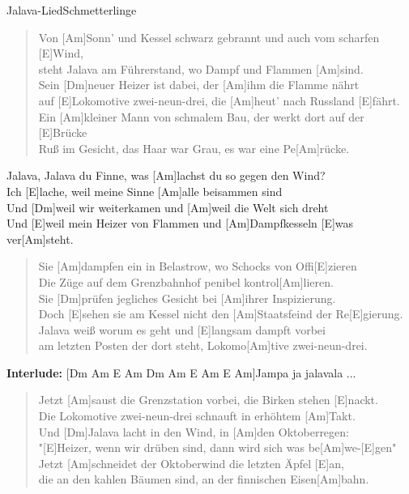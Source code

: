 \begin{song}{Jalava-Lied}{Schmetterlinge}

    \begin{verse}  
        Von [Am]Sonn' und Kessel schwarz gebrannt und auch vom scharfen [E]Wind, \\
        steht Jalava am Führerstand, wo Dampf und Flammen [Am]sind. \\
        Sein [Dm]neuer Heizer ist dabei, der [Am]ihm die Flamme nährt \\
        auf [E]Lokomotive zwei-neun-drei, die [Am]heut' nach Russland [E]fährt. \\
        Ein [Am]kleiner Mann von schmalem Bau, der werkt dort auf der [E]Brücke \\
        Ruß im Gesicht, das Haar war Grau, es war eine Pe[Am]rücke.
    \end{verse}  

    \begin{chorus}
        [Dm]Jalava, Jalava du Finne, was [Am]lachst du so gegen den Wind? \\
        Ich [E]lache, weil meine Sinne [Am]alle beisammen sind \\
        Und [Dm]weil wir weiterkamen und [Am]weil die Welt sich dreht \\
        Und [E]weil mein Heizer von Flammen und [Am]Dampfkesseln [E]was ver[Am]steht.
    \end{chorus}

    \begin{verse}  
        Sie [Am]dampfen ein in Belastrow, wo Schocks von Offi[E]zieren \\
        Die Züge auf dem Grenzbahnhof penibel kontrol[Am]lieren. \\
        Sie [Dm]prüfen jegliches Gesicht bei [Am]ihrer Inspizierung. \\
        Doch [E]sehen sie am Kessel nicht den [Am]Staatsfeind der Re[E]gierung. \\
        [Am]Jalava weiß worum es geht und [E]langsam dampft vorbei \\
        am letzten Posten der dort steht, Lokomo[Am]tive zwei-neun-drei.
    \end{verse}  


    \textbf{Interlude:} [Dm Am E Am Dm Am E Am E Am]Jampa ja jalavala ...

    \begin{verse}  
        Jetzt [Am]saust die Grenzstation vorbei, die Birken stehen [E]nackt. \\
        Die Lokomotive zwei-neun-drei schnauft in erhöhtem [Am]Takt. \\
        Und [Dm]Jalava lacht in den Wind, in [Am]den Oktoberregen: \\
        "[E]Heizer, wenn wir drüben sind, dann wird sich was be[Am]we-[E]gen" \\
        Jetzt [Am]schneidet der Oktoberwind die letzten Äpfel [E]an, \\
        die an den kahlen Bäumen sind, an der finnischen Eisen[Am]bahn.
    \end{verse}  


\end{song}
